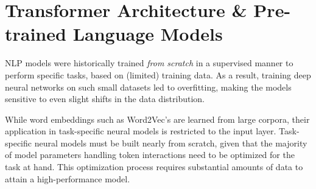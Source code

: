 \chapter{Transformer Architecture \& Pre-trained Language Models}
\label{chapter:related-pretrained-language-models}


\renewcommand{\leftmark}{\spacedlowsmallcaps{Pre-trained Language Models}}


\minitoc



\ac{NLP} models were historically trained \textit{from scratch} in a supervised manner to perform specific tasks, based on (limited) training data. As a result, training deep neural networks on such small datasets led to overfitting, making the models sensitive to even slight shifts in the data distribution. 

While word embeddings such as Word2Vec's \citep{mikolov2013efficient} are learned from large corpora, their application in task-specific neural models is restricted to the input layer. Task-specific neural models must be built nearly from scratch, given that the majority of model parameters handling token interactions need to be optimized for the task at hand. This optimization process requires substantial amounts of data to attain a high-performance model.



